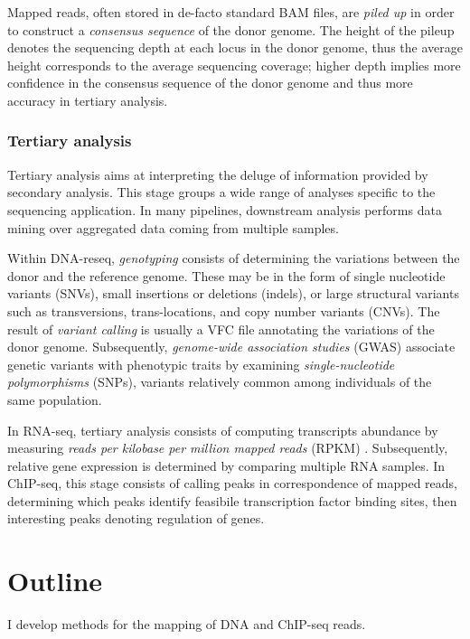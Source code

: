 Mapped reads, often stored in de-facto standard BAM files, are \emph{piled up} in order to construct a \emph{consensus sequence} of the donor genome.
The height of the pileup denotes the sequencing depth at each locus in the donor genome, thus the average height corresponds to the average sequencing coverage;
higher depth implies more confidence in the consensus sequence of the donor genome and thus more accuracy in tertiary analysis.

\subsubsection{Tertiary analysis}

Tertiary analysis aims at interpreting the deluge of information provided by secondary analysis.
This stage groups a wide range of analyses specific to the sequencing application.
In many pipelines, downstream analysis performs data mining over aggregated data coming from multiple samples.

Within DNA-reseq, \emph{genotyping} consists of determining the variations between the donor and the reference genome.
These may be in the form of single nucleotide variants (SNVs), small insertions or deletions (indels), or large structural variants such as transversions, trans-locations, and copy number variants (CNVs).
The result of \emph{variant calling} is usually a VFC file annotating the variations of the donor genome.
Subsequently, \emph{genome-wide association studies} (GWAS) associate genetic variants with phenotypic traits by examining \emph{single-nucleotide polymorphisms} (SNPs), variants relatively common among individuals of the same population.

In RNA-seq, tertiary analysis consists of computing transcripts abundance by measuring \emph{reads per kilobase per million mapped reads} (RPKM) \citep{rnaseq}.
Subsequently, relative gene expression is determined by comparing multiple RNA samples.
In ChIP-seq, this stage consists of calling peaks in correspondence of mapped reads, determining which peaks identify feasibile transcription factor binding sites, then interesting peaks denoting regulation of genes.


\section{Outline}


I develop methods for the mapping of DNA and ChIP-seq reads.
